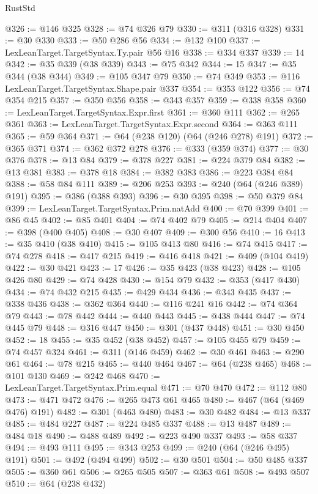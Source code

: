 \begin{lexlean}{RustStd}
\begin{coremodule}
@326 := @146 @325
@328 := @74 @326 @79
@330 := @311 (@316 @328)
@331 := @30 @330
@333 := @50 @286 @56
@334 := @132 @100
@337 := LexLeanTarget.TargetSyntax.Ty.pair @56 @16
@338 := @334 @337
@339 := 14
@342 := @35 @339 (@38 @339)
@343 := @75 @342
@344 := 15
@347 := @35 @344 (@38 @344)
@349 := @105 @347 @79
@350 := @74 @349
@353 := @116 LexLeanTarget.TargetSyntax.Shape.pair @337
@354 := @353 @122
@356 := @74 @354 @215
@357 := @350 @356
@358 := @343 @357
@359 := @338 @358
@360 := LexLeanTarget.TargetSyntax.Expr.first
@361 := @360 @111
@362 := @265 @361
@363 := LexLeanTarget.TargetSyntax.Expr.second
@364 := @363 @111
@365 := @59 @364
@371 := @64 (@238 @120) (@64 (@246 @278) @191)
@372 := @365 @371
@374 := @362 @372 @278
@376 := @333 (@359 @374)
@377 := @30 @376
@378 := @13 @84
@379 := @378 @227
@381 := @224 @379 @84
@382 := @13 @381
@383 := @378 @18
@384 := @382 @383
@386 := @223 @384 @84
@388 := @58 @84 @111
@389 := @206 @253
@393 := @240 (@64 (@246 @389) @191)
@395 := @386 (@388 @393)
@396 := @30 @395
@398 := @50 @379 @84
@399 := LexLeanTarget.TargetSyntax.Prim.natAdd
@400 := @70 @399
@401 := @86 @45
@402 := @85 @401
@404 := @74 @402 @79
@405 := @214 @404
@407 := @398 (@400 @405)
@408 := @30 @407
@409 := @300 @56
@410 := 16
@413 := @35 @410 (@38 @410)
@415 := @105 @413 @80
@416 := @74 @415
@417 := @74 @278
@418 := @417 @215
@419 := @416 @418
@421 := @409 (@104 @419)
@422 := @30 @421
@423 := 17
@426 := @35 @423 (@38 @423)
@428 := @105 @426 @80
@429 := @74 @428
@430 := @154 @79
@432 := @353 (@417 @430)
@434 := @74 @432 @215
@435 := @429 @434
@436 := @343 @435
@437 := @338 @436
@438 := @362 @364
@440 := @116 @241 @16
@442 := @74 @364 @79
@443 := @78 @442
@444 := @440 @443
@445 := @438 @444
@447 := @74 @445 @79
@448 := @316 @447
@450 := @301 (@437 @448)
@451 := @30 @450
@452 := 18
@455 := @35 @452 (@38 @452)
@457 := @105 @455 @79
@459 := @74 @457 @324
@461 := @311 (@146 @459)
@462 := @30 @461
@463 := @290 @61
@464 := @78 @215
@465 := @440 @464
@467 := @64 (@238 @465)
@468 := @101 @130
@469 := @242 @468
@470 := LexLeanTarget.TargetSyntax.Prim.equal
@471 := @70 @470
@472 := @112 @80
@473 := @471 @472
@476 := @265 @473 @61 @465
@480 := @467 (@64 (@469 @476) @191)
@482 := @301 (@463 @480)
@483 := @30 @482
@484 := @13 @337
@485 := @484 @227
@487 := @224 @485 @337
@488 := @13 @487
@489 := @484 @18
@490 := @488 @489
@492 := @223 @490 @337
@493 := @58 @337
@494 := @493 @111
@495 := @343 @253
@499 := @240 (@64 (@246 @495) @191)
@501 := @492 (@494 @499)
@502 := @30 @501
@504 := @50 @485 @337
@505 := @360 @61
@506 := @265 @505
@507 := @363 @61
@508 := @493 @507
@510 := @64 (@238 @432)

\end{coremodule}
\end{lexlean}
